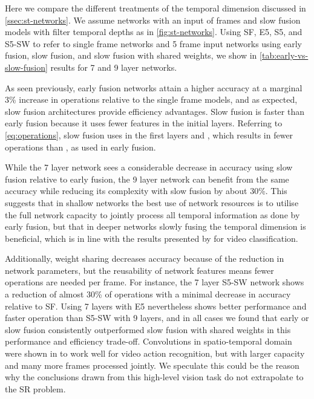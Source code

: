 \documentclass[10pt,twocolumn,letterpaper]{article}
\begin{document}
Here we compare the different treatments of the temporal dimension discussed in \cref{ssec:st-networks}. We assume networks with an input of  frames and slow fusion models with filter temporal depths  as in \cref{fig:st-networks}. Using SF, E5, S5, and S5-SW to refer to single frame networks and 5 frame input networks using early fusion, slow fusion, and slow fusion with shared weights, we show in \cref{tab:early-vs-slow-fusion} results for 7 and 9 layer networks. 

As seen previously, early fusion networks attain a higher accuracy at a marginal 3\% increase in operations relative to the single frame models, and as expected, slow fusion architectures provide efficiency advantages. Slow fusion is faster than early fusion because it uses fewer features in the initial layers. Referring to \cref{eq:operations}, slow fusion uses  in the first layers and , which results in fewer operations than ,  as used in early fusion.

While the 7 layer network sees a considerable decrease in accuracy using slow fusion relative to early fusion, the 9 layer network can benefit from the same accuracy while reducing its complexity with slow fusion by about 30\%. This suggests that in shallow networks the best use of network resources is to utilise the full network capacity to jointly process all temporal information as done by early fusion, but that in deeper networks slowly fusing the temporal dimension is beneficial, which is in line with the results presented by \cite{Karpathy2014a} for video classification.

Additionally, weight sharing decreases accuracy because of the reduction in network parameters, but the reusability of network features means fewer operations are needed per frame. For instance, the 7 layer S5-SW network shows a reduction of almost 30\% of operations with a minimal decrease in accuracy relative to SF. Using 7 layers with E5 nevertheless shows better performance and faster operation than S5-SW with 9 layers, and in all cases we found that early or slow fusion consistently outperformed slow fusion with shared weights in this performance and efficiency trade-off. Convolutions in spatio-temporal domain were shown in \cite{Tran2015} to work well for video action recognition, but with larger capacity and many more frames processed jointly. We speculate this could be the reason why the conclusions drawn from this high-level vision task do not extrapolate to the \gls{SR} problem.
\end{document}
